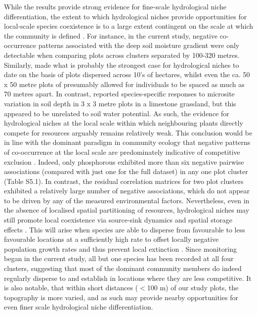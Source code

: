 While the results provide strong evidence for fine-scale hydrological niche differentiation, the extent to which hydrological niches provide opportunities for local-scale species coexistence is to a large extent contingent on the scale at which the community is defined \citep{Amarasekare2003, Adler2013}. For instance, in the current study, negative co-occurrence patterns associated with the deep soil moisture gradient were only detectable when comparing plots across clusters separated by 100-320 metres. Similarly, \citet{Silvertown1999} made what is probably the strongest case for hydrological niches to date on the basis of plots dispersed across 10's of hectares, whilst even the ca. 50 x 50 metre plots of \cite{Araya2011} presumably allowed for individuals to be spaced as much as 70 metres apart. In contrast, \citet{Fridley2011} reported species-specific responses to microsite variation in soil depth in 3 x 3 metre plots in a limestone grassland, but this appeared to be unrelated to soil water potential. As such, the evidence for hydrological niches at the local scale within which neighbouring plants directly compete for resources arguably remains relatively weak. This conclusion would be in line with the dominant paradigm in community ecology that negative patterns of co-occurrence at the local scale are predominately indicative of competitive exclusion \citep[][but see Fridley \textit{et al.} 2011]{Gotelli2002}. Indeed, only phosphorous exhibited more than six negative pairwise associations (compared with just one for the full dataset) in any one plot cluster (Table S5.1). In contrast, the residual correlation matrices for two plot clusters exhibited a relatively large number of negative associations, which do not appear to be driven by any of the measured environmental factors. Nevertheless, even in the absence of localised spatial partitioning of resources, hydrological niches may still promote local coexistence via source-sink dynamics and spatial storage effects \citep{Shmida1984, Amarasekare2003, Snyder2004}. This will arise when species are able to disperse from favourable to less favourable locations at a sufficiently high rate to offset locally negative population growth rates and thus prevent local extinction \citep{Snyder2004}. Since monitoring began in the current study, all but one species has been recorded at all four clusters, suggesting that most of the dominant community members do indeed regularly disperse to and establish in locations where they are less competitive. It is also notable, that within short distances ($<$100 m) of our study plots, the topography is more varied, and as such may provide nearby opportunities for even finer scale hydrological niche differentiation. 

